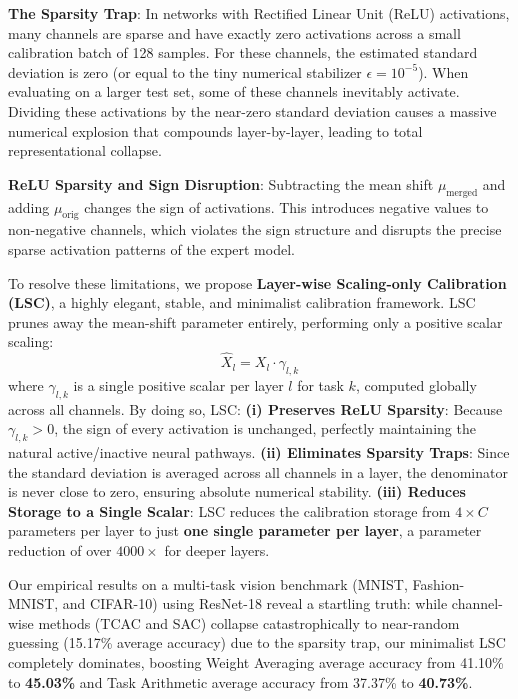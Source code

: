\documentclass{article}
\theoremstyle{plain}
\theoremstyle{definition}
\theoremstyle{remark}
\begin{document}
\textbf{The Sparsity Trap}: In networks with Rectified Linear Unit (ReLU) activations, many channels are sparse and have exactly zero activations across a small calibration batch of 128 samples. For these channels, the estimated standard deviation is zero (or equal to the tiny numerical stabilizer $\epsilon = 10^{-5}$). When evaluating on a larger test set, some of these channels inevitably activate. Dividing these activations by the near-zero standard deviation causes a massive numerical explosion that compounds layer-by-layer, leading to total representational collapse.

\textbf{ReLU Sparsity and Sign Disruption}: Subtracting the mean shift $\mu_{\text{merged}}$ and adding $\mu_{\text{orig}}$ changes the sign of activations. This introduces negative values to non-negative channels, which violates the sign structure and disrupts the precise sparse activation patterns of the expert model.

To resolve these limitations, we propose \textbf{Layer-wise Scaling-only Calibration (LSC)}, a highly elegant, stable, and minimalist calibration framework. LSC prunes away the mean-shift parameter entirely, performing only a positive scalar scaling:
\begin{equation}
    \hat{X}_l = X_l \cdot \gamma_{l,k}
\end{equation}
where $\gamma_{l,k}$ is a single positive scalar per layer $l$ for task $k$, computed globally across all channels. By doing so, LSC:
\textbf{(i) Preserves ReLU Sparsity}: Because $\gamma_{l,k} > 0$, the sign of every activation is unchanged, perfectly maintaining the natural active/inactive neural pathways.
\textbf{(ii) Eliminates Sparsity Traps}: Since the standard deviation is averaged across all channels in a layer, the denominator is never close to zero, ensuring absolute numerical stability.
\textbf{(iii) Reduces Storage to a Single Scalar}: LSC reduces the calibration storage from $4 \times C$ parameters per layer to just \textbf{one single parameter per layer}, a parameter reduction of over $4000\times$ for deeper layers.

Our empirical results on a multi-task vision benchmark (MNIST, Fashion-MNIST, and CIFAR-10) using ResNet-18 reveal a startling truth: while channel-wise methods (TCAC and SAC) collapse catastrophically to near-random guessing (15.17\% average accuracy) due to the sparsity trap, our minimalist LSC completely dominates, boosting Weight Averaging average accuracy from 41.10\% to \textbf{45.03\%} and Task Arithmetic average accuracy from 37.37\% to \textbf{40.73\%}. 
\end{document}
